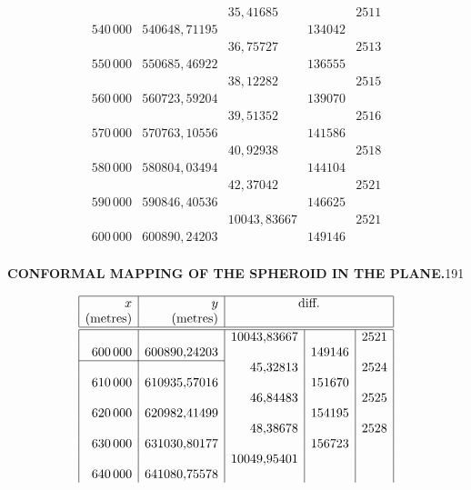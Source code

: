 {\[\begin{array}{|r|r|r|r|r|}
&&35{,}41685&&2511\\
540\,000&540648{,}71195&&134042&\\
&&36{,}75727&&2513\\
550\,000&550685{,}46922&&136555&\\
&&38{,}12282&&2515\\
560\,000&560723{,}59204&&139070&\\
&&39{,}51352&&2516\\
570\,000&570763{,}10556&&141586&\\
&&40{,}92938&&2518\\
580\,000&580804{,}03494&&144104&\\
&&42{,}37042&&2521\\
590\,000&590846{,}40536&&146625&\\
&&10043{,}83667&&2521\\
600\,000&600890{,}24203&&149146&\\
\end{array}\]
}


\par\clearpage
\noindent\null\hfill{\small\textbf{CONFORMAL MAPPING OF THE SPHEROID IN THE PLANE.}}\hfill191\par\medskip
{\small\renewcommand{\arraystretch}{.85}
\[\begin{array}{|r|r|r|r|r|}\hline
x&y&\multicolumn{3}{c|}{\text{diff.}}\\
\text{(metres)}&\text{(metres)}&\multicolumn{3}{c|}{}\\\hline\hline
&&10043{,}83667&&2521\\
600\,000&600890{,}24203&&149146&\\
\cline{1-2}
&&45{,}32813&&2524\\
610\,000&610935{,}57016&&151670&\\
&&46{,}84483&&2525\\
620\,000&620982{,}41499&&154195&\\
&&48{,}38678&&2528\\
630\,000&631030{,}80177&&156723&\\
&&10049{,}95401&&\\
640\,000&641080{,}75578&&&\\
\end{array}\]
}

